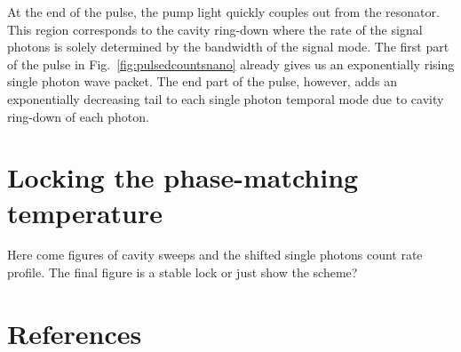 \documentclass[aps,pra,showpacs,reprint,onecolumn,notitlepage]{revtex4-1}
\begin{document}
At the end of the pulse, the pump light quickly couples out from the resonator. This region corresponds to the cavity ring-down where the rate of the signal photons is solely determined by the bandwidth of the signal mode. The first part of the pulse in Fig.~\ref{fig:pulsedcountsnano} already gives us an exponentially rising single photon wave packet. The end part of the pulse, however, adds an exponentially decreasing tail to each single photon temporal mode due to cavity ring-down of each photon.

\section{Locking the phase-matching temperature}
Here come figures of cavity sweeps and the shifted single photons count rate profile. The final figure is a stable lock or just show the scheme?

\section{References}
	
	
%	

%
\end{document}
